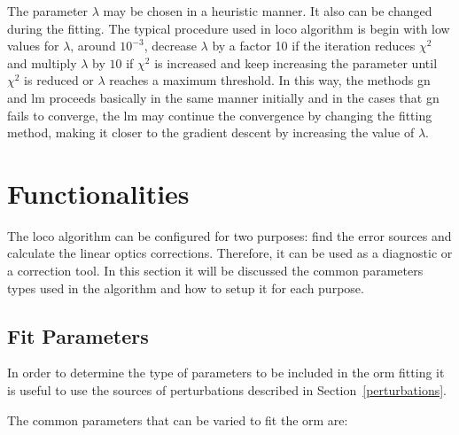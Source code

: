 The parameter $\lambda$ may be chosen in a heuristic manner. It also can be changed during the fitting. The typical procedure used in \gls{loco} algorithm \cite{icfa} is begin with low values for $\lambda$, around $10^{-3}$, decrease $\lambda$ by a factor 10 if the iteration reduces $\chi^2$ and multiply $\lambda$ by $10$ if $\chi^2$ is increased and keep increasing the parameter until $\chi^2$ is reduced or $\lambda$ reaches a maximum threshold. In this way, the methods \gls{gn} and \gls{lm} proceeds basically in the same manner initially and in the cases that \gls{gn} fails to converge, the \gls{lm} may continue the convergence by changing the fitting method, making it closer to the gradient descent by increasing the value of $\lambda$.

\section{Functionalities}

The \gls{loco} algorithm can be configured for two purposes: find the error sources and calculate the linear optics corrections. Therefore, it can be used as a diagnostic or a correction tool. In this section it will be discussed the common parameters types used in the algorithm and how to setup it for each purpose.

\subsection{Fit Parameters}

In order to determine the type of parameters to be included in the \gls{orm} fitting it is useful to use the sources of perturbations described in Section~\ref{perturbations}.

The common parameters that can be varied to fit the \gls{orm} are:

